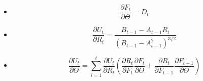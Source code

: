 \documentclass[11pt]{exam}
\theoremstyle{quest}
\newcommand{\deriv}[2]{\frac{\partial #1}{\partial #2}}
\begin{document}
\begin{itemize}
\begin{itemize}
        \item $$\deriv{F_{t}}{\Theta} = D_t$$
        \item $$\deriv{U_t}{R_t}=\frac{B_{t-1}-A_{t-1} R_t}{(B_{t-1} - A_{t-1}^2)^{3/2}}$$
        \item $$\deriv{U_{t}}{\Theta} = \sum_{i=1}^t \deriv{U_t}{R_t}\left(\deriv{R_t}{F_t}\deriv{F_{t}}{\Theta} + \deriv{R_t}{F_{t-1}}\deriv{F_{t-1}}{\Theta} \right)$$
    \end{itemize}
    
    

\end{itemize}
\end{document}
